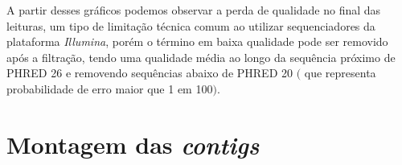A partir desses gráficos podemos observar a perda de qualidade no final das leituras, um tipo de limitação
técnica comum ao utilizar sequenciadores da plataforma \textit{Illumina}, porém o término em baixa qualidade
pode ser removido após a filtração, tendo uma qualidade média ao longo da sequência próximo de PHRED 26 e
removendo sequências abaixo de PHRED 20 $($ que representa probabilidade de erro maior que 1 em 100$)$.


\section{Montagem das \textit{contigs}}
\begin{table}[htb]
\end{table}
